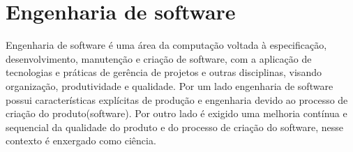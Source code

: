 

\section{Engenharia de software}

Engenharia de software é uma área da computação voltada à especificação, desenvolvimento, manutenção e criação de software, com a  aplicação de tecnologias e práticas de gerência de projetos e outras disciplinas, visando organização, produtividade e qualidade\cite{engenhariawikipedia}. Por um lado engenharia de software possui características explícitas de produção e engenharia devido ao processo de criação do produto(software). Por outro lado é exigido uma melhoria contínua e sequencial da qualidade do produto e do processo de criação do software, nesse contexto é enxergado como ciência\cite{travassos2002introducao}.



